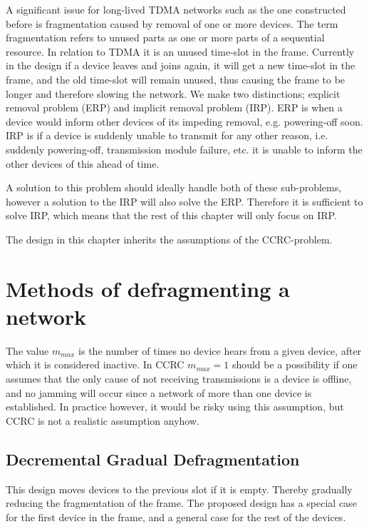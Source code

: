 A significant issue for long-lived TDMA networks such as the one constructed before is fragmentation caused by removal of one or more devices. 
The term fragmentation refers to unused parts as one or more parts of a sequential resource. 
In relation to TDMA it is an unused time-slot in the frame. 
Currently in the design if a device leaves and joins again, it will get a new time-slot in the frame, and the old time-slot will remain unused, thus causing the frame to be longer and therefore slowing the network.
We make two distinctions; explicit removal problem (ERP) and implicit removal problem (IRP).
ERP is when a device would inform other devices of its impeding removal, e.g. powering-off soon. 
IRP is if a device is suddenly unable to transmit for any other reason, i.e. suddenly powering-off, transmission module failure, etc. it is unable to inform the other devices of this ahead of time. 

A solution to this problem should ideally handle both of these sub-problems, however a solution to the IRP will also solve the ERP.
Therefore it is sufficient to solve IRP, which means that the rest of this chapter will only focus on IRP.  

The design in this chapter inherits the assumptions of the CCRC-problem. 

\section{Methods of defragmenting a network}

The value $m_{max}$ is the number of times no device hears from a given device, after which it is considered inactive. 
In CCRC $m_{max} = 1$ should be a possibility if one assumes that the only cause of not receiving transmissions is a device is offline, and no jamming will occur since a network of more than one device is established.
In practice however, it would be risky using this assumption, but CCRC is not a realistic assumption anyhow.

\subsection{Decremental Gradual Defragmentation}
This design moves devices to the previous slot if it is empty. 
Thereby gradually reducing the fragmentation of the frame.
The proposed design has a special case for the first device in the frame, and a general case for the rest of the devices.


